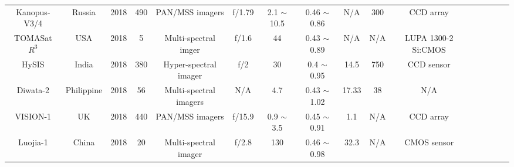 \documentclass[final,5p,times,twocolumn]{elsarticle}
\begin{document}
\begin{table}
{\begin{tabular}{c c c c c c c c c c c c c c c c}
 		   Kanopus-V3/4 & Russia & 2018 & 490 & PAN/MSS imagers & f/1.79 & 2.1 $\sim$ 10.5 & 0.46 $\sim$ 0.86 &  N/A & 300 &  CCD array & \citep{spacef2018}\\
 		   TOMASat $R^3$ & USA & 2018 & 5 & Multi-spectral imger & f/1.6 & 44 & 0.43 $\sim$ 0.89 &  N/A & N/A &  LUPA 1300-2 Si:CMOS & \citep{eoportal}\\ 
 		   HySIS & India & 2018 & 380 & Hyper-spectral imager & f/2 & 30 & 0.4 $\sim$ 0.95 &  14.5 & 750 &  CCD sensor & \citep{sita2019automatic} \\
 		   Diwata-2 & Philippine & 2018 & 56 & Multi-spectral imagers & N/A & 4.7 & 0.43 $\sim$ 1.02 &  17.33 & 38 & N/A & \citep{violan2021flight}\\ 
 		   VISION-1 & UK & 2018 & 440 & PAN/MSS imagers & f/15.9 & 0.9 $\sim$ 3.5 & 0.45 $\sim$ 0.91 & 1.1 & N/A &CCD array  &\citep{eoportal}\\ 
 		   Luojia-1 & China & 2018 & 20 & Multi-spectral imager & f/2.8 & 130 & 0.46 $\sim$ 0.98 &  32.3 &  N/A & CMOS sensor & \citep{jiang2018potentiality} \\
 		  	    	    	    	                      	       	    	    	    	        	           		    		      		       	    
		\hline
		\end{tabular}
	}
\label{table:nonlin} %
\end{table}
\end{document}

